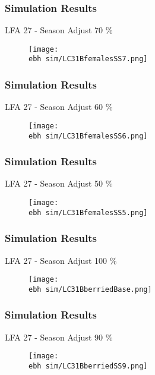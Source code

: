 \documentclass{beamer}
\newcommand{\ebh}{\string~/bio.data/bio.lobster/figures/LFA2733Framework2018/} %
\begin{document}
\begin{frame}
\frametitle{Simulation Results}
LFA 27 - Season Adjust 70 \%
\begin{figure}
        \begin{center}
            \texttt{[image: \\ebh sim/LC31BfemalesSS7.png]}
        \end{center}
    \end{figure}
\end{frame}


\begin{frame}
\frametitle{Simulation Results}
LFA 27 - Season Adjust 60 \%
\begin{figure}
        \begin{center}
            \texttt{[image: \\ebh sim/LC31BfemalesSS6.png]}
        \end{center}
    \end{figure}
\end{frame}


\begin{frame}
\frametitle{Simulation Results}
LFA 27 - Season Adjust 50 \%
\begin{figure}
        \begin{center}
            \texttt{[image: \\ebh sim/LC31BfemalesSS5.png]}
        \end{center}
    \end{figure}
\end{frame}






\begin{frame}
\frametitle{Simulation Results}
LFA 27 - Season Adjust 100 \%
\begin{figure}
        \begin{center}
            \texttt{[image: \\ebh sim/LC31BberriedBase.png]}
        \end{center}
    \end{figure}
\end{frame}


\begin{frame}
\frametitle{Simulation Results}
LFA 27 - Season Adjust 90 \%
\begin{figure}
        \begin{center}
            \texttt{[image: \\ebh sim/LC31BberriedSS9.png]}
        \end{center}
    \end{figure}
\end{frame}
\end{document}
